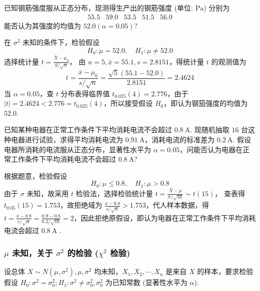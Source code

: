 \begin{example}
    已知钢筋强度服从正态分布，现测得生产出的钢筋强度 (单位: $ \mathrm{Pa} $) 分别为
    $$\begin{array}{lllll}
            55.5 & 59.0 & 53.5 & 51.5 & 56.0
        \end{array}$$
    能否认为其强度的均值为 $ 52.0(\alpha=0.05) $?
\end{example}
\begin{solution}
    在 $ \sigma^{2} $ 未知的条件下，检验假设
    $$H_{0}: \mu=52.0, \quad H_{1}: \mu \neq 52.0$$
    选择统计量 $\displaystyle t=\frac{\bar{X}-\mu_{0}}{S / \sqrt{n}}$，
    由 $ n=5, \bar{x}=55.1, s=2.8151 $，得统计量 $ t $ 的观测值为
    $$t=\frac{\bar{x}-\mu_{0}}{s / \sqrt{n}}=\frac{\sqrt{5}(55.1-52.0)}{2.8151}=2.4624$$
    当 $ \alpha=0.05 $，查 $ t $ 分布表得临界值 $ t_{0.025}(4)=2.776 $，由于 $ |t|=2.4624<2.776=t_{0.025}  (4)$，所以接受假设 $ H_{0} $，即认为钢笳强度的均值为 $ 52.0 $.
\end{solution}

\begin{example}
    已知某种电器在正常工作条件下平均消耗电流不会超过 $ 0.8 \mathrm{~A} $. 
    现随机抽取 $16$ 台这种电器进行试验，求得平均消耗电流为 $ 0.91 \mathrm{~A} $，消耗电流的标准差为 $ 0.2 \mathrm{~A}$. 
    假设电器所消耗的电流服从正态分布，显著性水平为 $ \alpha=0.05$，问能否认为电器在正常工作条件下平均消耗电流不会超过 $ 0.8 \mathrm{~A}$?
\end{example}
\begin{solution}
    根据题意，检验假设
    $$H_{0}: \mu \leqslant 0.8, \quad H_{1}: \mu>0.8$$
    由于 $ \sigma $ 未知，故采用 $ t $ 检验法，选择检验统计量 $\displaystyle t=\frac{\bar{X}-\mu}{S / \sqrt{16}} \sim t(15) $，
    查表得 $ t_{0.05}(15)=  1.753$，故拒绝域为 $\displaystyle \frac{\bar{x}-0.8}{s / \sqrt{n}}>1.753 $，代人样本数据，得 $\displaystyle t=\frac{\bar{x}-0.8}{s / \sqrt{n}}=\frac{0.9-0.8}{0.2 / \sqrt{16}}=2 $，因此拒绝原假设，即认为电器在正常工作条件下平均消耗电流会超过  $0.8 \mathrm{~A}$ .
\end{solution}

\subsubsection{\texorpdfstring{$\mu$}. 未知，关于 \texorpdfstring{$\sigma^2$}. 的检验 (\texorpdfstring{$\chi^2$}. 检验)}

设总体 $ X \sim N\left(\mu, \sigma^{2}\right), \mu, \sigma^{2} $ 均未知，$X_{1}, X_{2}, \cdots, X_{n} $ 是来自 $ X $ 的样本，要求检验假设 $ H_{0}: \sigma^{2}=\sigma_{0}^{2} ; H_{1}: \sigma^{2} \neq \sigma_{0}^{2}, \sigma_{0}^{2} $ 为已知常数 (显著性水平为 $ \alpha $).

